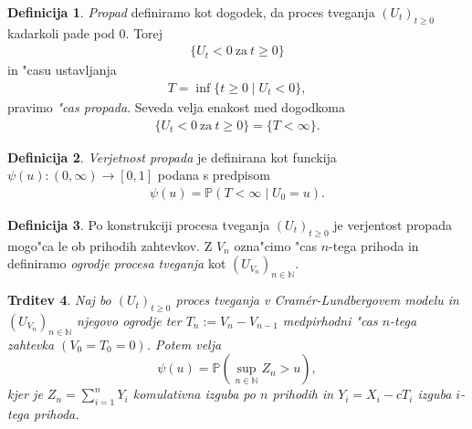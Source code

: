 \documentclass[12pt, a4paper, reqno]{amsart}
\theoremstyle{definition}
\newtheorem{definicija}{Definicija}[section]
\theoremstyle{plain}
\newtheorem{trditev}[definicija]{Trditev}
\newcommand{\N}{\mathbb{N}}
\newcommand{\Prob}{\mathbb{P}}
\newcommand{\1}{\mathds{1}}
\begin{document}
        \begin{definicija}
            \textit{Propad} definiramo kot dogodek, da proces tveganja $(U_t)_{t\geq0}$ kadarkoli pade pod $0$. 
            Torej 
            \begin{align*}
                \bigl\{U_t<0 \ \text{za} \ t\geq 0\bigr\}
            \end{align*}
            in "casu ustavljanja
            \begin{align*}
                T = \inf\{t\geq0 \mid U_t < 0\}, 
            \end{align*}
            pravimo \textit{"cas propada}. Seveda velja enakost med dogodkoma
            \begin{align*}
                \{U_t<0 \ \text{za} \ t\geq0\} = \{T<\infty\}.
            \end{align*}
            \label{def:PropadCasPropada} 
        \end{definicija}

        \begin{definicija}
            \textit{Verjetnost propada} je definirana kot funckija $\psi(u): (0,\infty) \to [0,1]$ 
            podana s predpisom
            \begin{align*}
                \psi(u) = \Prob(T<\infty \mid U_0 = u).
            \end{align*}
            \label{def:VerjetnostPropada}
        \end{definicija}

        \begin{definicija}
            Po konstrukciji procesa tveganja $(U_t)_{t\geq0}$ je verjentost propada mogo"ca le ob 
            prihodih zahtevkov. %
            Z $V_n$ ozna"cimo "cas $n$-tega prihoda in definiramo 
            \textit{ogrodje procesa tveganja} kot $(U_{V_n})_{n\in\N}$.
            \label{def:ogrodjeProcesaTveganja}
        \end{definicija}

        \begin{trditev}
            Naj bo $(U_t)_{t\geq0}$ proces tveganja v Cramér-Lundbergovem modelu in $(U_{V_n})_{n\in\N}$ 
            njegovo ogrodje ter $T_n := V_n - V_{n-1}$ medpirhodni "cas $n$-tega zahtevka 
            $(V_0 = T_0 = 0)$. Potem velja 
            \begin{equation*}
                \psi(u) = \Prob\left(\sup_{n\in\N}Z_n > u\right),
            \end{equation*}
            kjer je $Z_n = \sum_{i=1}^nY_i$  komulativna izguba po $n$ prihodih in $Y_i = X_i - cT_i$
            izguba $i$-tega prihoda.
            \label{trd:verjetnostPropadaZOgrodjem}
        \end{trditev}
\end{document}
